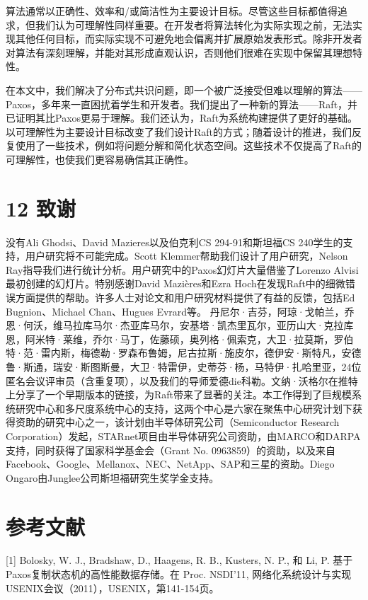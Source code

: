 \documentclass[12pt,a4paper]{report} %
\begin{document}
算法通常以正确性、效率和/或简洁性为主要设计目标。尽管这些目标都值得追求，但我们认为可理解性同样重要。在开发者将算法转化为实际实现之前，无法实现其他任何目标，而实际实现不可避免地会偏离并扩展原始发表形式。除非开发者对算法有深刻理解，并能对其形成直观认识，否则他们很难在实现中保留其理想特性。

在本文中，我们解决了分布式共识问题，即一个被广泛接受但难以理解的算法——Paxos，多年来一直困扰着学生和开发者。我们提出了一种新的算法——Raft，并已证明其比Paxos更易于理解。我们还认为，Raft为系统构建提供了更好的基础。以可理解性为主要设计目标改变了我们设计Raft的方式；随着设计的推进，我们反复使用了一些技术，例如将问题分解和简化状态空间。这些技术不仅提高了Raft的可理解性，也使我们更容易确信其正确性。

\section*{12 致谢}

没有Ali Ghodsi、David Mazieres以及伯克利CS 294-91和斯坦福CS 240学生的支持，用户研究将不可能完成。Scott Klemmer帮助我们设计了用户研究，Nelson Ray指导我们进行统计分析。用户研究中的Paxos幻灯片大量借鉴了Lorenzo Alvisi最初创建的幻灯片。特别感谢David Mazières和Ezra Hoch在发现Raft中的细微错误方面提供的帮助。许多人士对论文和用户研究材料提供了有益的反馈，包括Ed Bugnion、Michael Chan、Hugues Evrard等。
丹尼尔·吉芬，阿琼·戈帕兰，乔恩·何沃，维马拉库马尔·杰亚库马尔，安基塔·凯杰里瓦尔，亚历山大·克拉库恩，阿米特·莱维，乔尔·马丁，佐藤硕，奥列格·佩索克，大卫·拉莫斯，罗伯特·范·雷内斯，梅德勒·罗森布鲁姆，尼古拉斯·施皮尔，德伊安·斯特凡，安德鲁·斯通，瑞安·斯图斯曼，大卫·特雷伊，史蒂芬·杨，马特伊·扎哈里亚，24位匿名会议评审员（含重复项），以及我们的导师爱德die科勒。文纳·沃格尔在推特上分享了一个早期版本的链接，为Raft带来了显著的关注。本工作得到了巨规模系统研究中心和多尺度系统中心的支持，这两个中心是六家在聚焦中心研究计划下获得资助的研究中心之一，该计划由半导体研究公司（Semiconductor Research Corporation）发起，STARnet项目由半导体研究公司资助，由MARCO和DARPA支持，同时获得了国家科学基金会（Grant No. 0963859）的资助，以及来自Facebook、Google、Mellanox、NEC、NetApp、SAP和三星的资助。Diego Ongaro由Junglee公司斯坦福研究生奖学金支持。

\section*{参考文献}

[1] Bolosky, W. J., Bradshaw, D., Haagens, R. B., Kusters, N. P., 和 Li, P. 基于Paxos复制状态机的高性能数据存储。在 Proc. NSDI'11, 网络化系统设计与实现USENIX会议（2011），USENIX，第141-154页。
\end{document}
